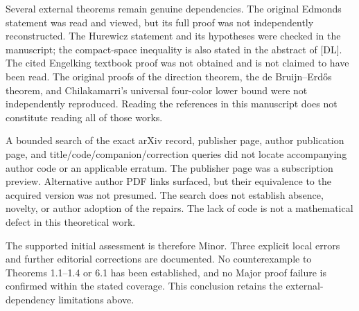 \documentclass[10pt]{article}
\begin{document}
Several external theorems remain genuine dependencies. The original Edmonds statement was read and viewed, but its full proof was not independently reconstructed. The Hurewicz statement and its hypotheses were checked in the manuscript; the compact-space inequality is also stated in the abstract of [DL]. The cited Engelking textbook proof was not obtained and is not claimed to have been read. The original proofs of the direction theorem, the de Bruijn–Erdős theorem, and Chilakamarri’s universal four-color lower bound were not independently reproduced. Reading the references in this manuscript does not constitute reading all of those works.\par
A bounded search of the exact arXiv record, publisher page, author publication page, and title/code/companion/correction queries did not locate accompanying author code or an applicable erratum. The publisher page was a subscription preview. Alternative author PDF links surfaced, but their equivalence to the acquired version was not presumed. The search does not establish absence, novelty, or author adoption of the repairs. The lack of code is not a mathematical defect in this theoretical work.\par
The supported initial assessment is therefore Minor. Three explicit local errors and further editorial corrections are documented. No counterexample to Theorems 1.1–1.4 or 6.1 has been established, and no Major proof failure is confirmed within the stated coverage. This conclusion retains the external-dependency limitations above.\par
\end{document}
